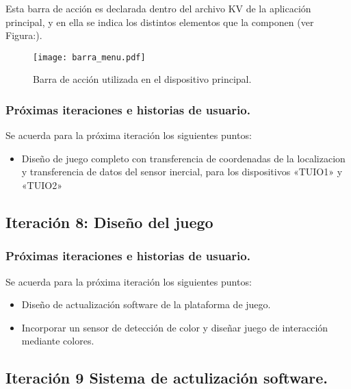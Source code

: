 Esta barra de acción es declarada dentro del archivo KV de la aplicación principal, y en ella se indica los distintos elementos que la componen (ver Figura:\label{barra_menu}). 
\begin{figure}[!h]
\begin{center}
\texttt{[image: barra\_menu.pdf]}
\caption{Barra de acción utilizada en el dispositivo principal. }
\label{fig:barra_menu}
\end{center}
\end{figure}




\subsubsection{Próximas iteraciones e historias de usuario.}
Se acuerda para la próxima iteración los siguientes puntos:
\begin{itemize}
\item Diseño de juego completo con transferencia de coordenadas de la localizacion y transferencia de datos del sensor inercial, para los dispositivos «TUIO1» y «TUIO2»
\end{itemize}

\subsection{Iteración 8: Diseño del juego}




\subsubsection{Próximas iteraciones e historias de usuario.}
Se acuerda para la próxima iteración los siguientes puntos:
\begin{itemize}
\item Diseño de actualización software de la plataforma de juego.
\item Incorporar un sensor de detección de color y diseñar juego de interacción mediante colores.
\end{itemize}

\subsection{Iteración 9 Sistema de actulización software.}





